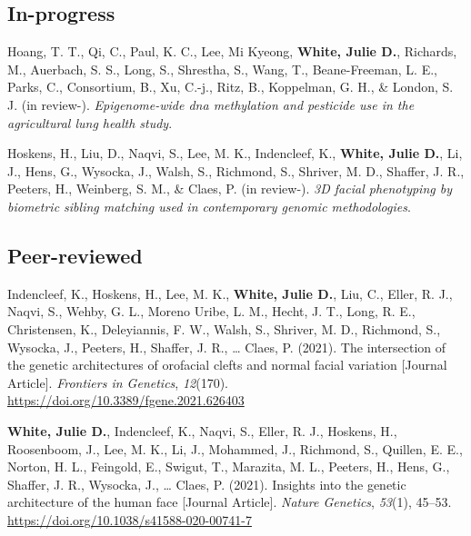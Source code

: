 \documentclass[11pt, a4paper]{awesome-cv}
\begin{document}
\hypertarget{in-progress}{%
\subsection{In-progress}\label{in-progress}}

\begingroup
\setlength{\parindent}{-0.5in}
\setlength{\leftskip}{0.5in}

\hypertarget{refs_inprogress}{}
\leavevmode\hypertarget{ref-Thanh_PesticideEWAS}{}%
Hoang, T. T., Qi, C., Paul, K. C., Lee, Mi Kyeong, \textbf{White, Julie
D.}, Richards, M., Auerbach, S. S., Long, S., Shrestha, S., Wang, T.,
Beane-Freeman, L. E., Parks, C., Consortium, B., Xu, C.-j., Ritz, B.,
Koppelman, G. H., \& London, S. J. (in review-). \emph{Epigenome-wide
dna methylation and pesticide use in the agricultural lung health
study}.

\leavevmode\hypertarget{ref-Hoskens_BiometricMatching}{}%
Hoskens, H., Liu, D., Naqvi, S., Lee, M. K., Indencleef, K.,
\textbf{White, Julie D.}, Li, J., Hens, G., Wysocka, J., Walsh, S.,
Richmond, S., Shriver, M. D., Shaffer, J. R., Peeters, H., Weinberg, S.
M., \& Claes, P. (in review-). \emph{3D facial phenotyping by biometric
sibling matching used in contemporary genomic methodologies}.

\endgroup

\hypertarget{peer-reviewed}{%
\subsection{Peer-reviewed}\label{peer-reviewed}}

\begingroup
\setlength{\parindent}{-0.5in}
\setlength{\leftskip}{0.5in}

\hypertarget{refs_published}{}
\leavevmode\hypertarget{ref-Indencleef_2021_NSCLP}{}%
Indencleef, K., Hoskens, H., Lee, M. K., \textbf{White, Julie D.}, Liu,
C., Eller, R. J., Naqvi, S., Wehby, G. L., Moreno Uribe, L. M., Hecht,
J. T., Long, R. E., Christensen, K., Deleyiannis, F. W., Walsh, S.,
Shriver, M. D., Richmond, S., Wysocka, J., Peeters, H., Shaffer, J. R.,
\ldots{} Claes, P. (2021). The intersection of the genetic architectures
of orofacial clefts and normal facial variation {[}Journal Article{]}.
\emph{Frontiers in Genetics}, \emph{12}(170).
\url{https://doi.org/10.3389/fgene.2021.626403}

\leavevmode\hypertarget{ref-White_Indencleef_2021_MetaGWAS}{}%
\textbf{White, Julie D.}, Indencleef, K., Naqvi, S., Eller, R. J.,
Hoskens, H., Roosenboom, J., Lee, M. K., Li, J., Mohammed, J., Richmond,
S., Quillen, E. E., Norton, H. L., Feingold, E., Swigut, T., Marazita,
M. L., Peeters, H., Hens, G., Shaffer, J. R., Wysocka, J., \ldots{}
Claes, P. (2021). Insights into the genetic architecture of the human
face {[}Journal Article{]}. \emph{Nature Genetics}, \emph{53}(1),
45--53. \url{https://doi.org/10.1038/s41588-020-00741-7}
\end{document}
